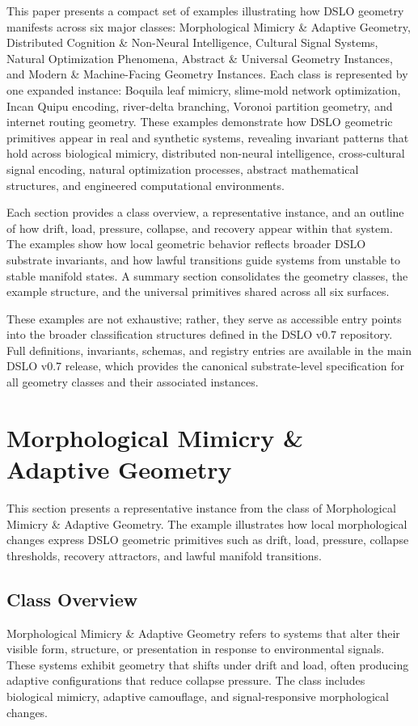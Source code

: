 This paper presents a compact set of examples illustrating how DSLO geometry manifests across six major
classes: Morphological Mimicry \& Adaptive Geometry, Distributed Cognition \& Non-Neural Intelligence,
Cultural Signal Systems, Natural Optimization Phenomena, Abstract \& Universal Geometry Instances, and
Modern \& Machine-Facing Geometry Instances. Each class is represented by one expanded instance:
Boquila leaf mimicry, slime-mold network optimization, Incan Quipu encoding, river-delta branching,
Voronoi partition geometry, and internet routing geometry. These examples demonstrate how DSLO
geometric primitives appear in real and synthetic systems, revealing invariant patterns that hold
across biological mimicry, distributed non-neural intelligence, cross-cultural signal encoding, natural
optimization processes, abstract mathematical structures, and engineered computational environments.

Each section provides a class overview, a representative instance, and an outline of how drift, load,
pressure, collapse, and recovery appear within that system. The examples show how local geometric
behavior reflects broader DSLO substrate invariants, and how lawful transitions guide systems from
unstable to stable manifold states. A summary section consolidates the geometry classes, the example
structure, and the universal primitives shared across all six surfaces.

These examples are not exhaustive; rather, they serve as accessible entry points into the broader
classification structures defined in the DSLO v0.7 repository. Full definitions, invariants, schemas,
and registry entries are available in the main DSLO v0.7 release, which provides the canonical
substrate-level specification for all geometry classes and their associated instances.


\section{Morphological Mimicry \& Adaptive Geometry}
\label{sec:morphological-mimicry}

This section presents a representative instance from the class of Morphological Mimicry \& Adaptive 
Geometry. The example illustrates how local morphological changes express DSLO geometric primitives 
such as drift, load, pressure, collapse thresholds, recovery attractors, and lawful manifold transitions.

\subsection{Class Overview}
Morphological Mimicry \& Adaptive Geometry refers to systems that alter their visible form, structure, 
or presentation in response to environmental signals. These systems exhibit geometry that shifts under 
drift and load, often producing adaptive configurations that reduce collapse pressure. The class includes 
biological mimicry, adaptive camouflage, and signal-responsive morphological changes.

